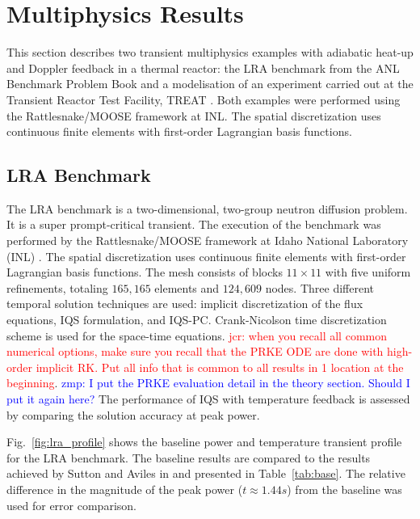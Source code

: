 \documentclass{elsarticle}
\newcommand{\fig}[1]{Fig.~\ref{#1}}                      %
\newcommand{\tbl}[1]{Table~\ref{#1}}                     %
\newcommand{\iqspc}{IQS-PC\xspace}
\newcommand{\jcr}[1]{\textcolor{red}{jcr: #1}}
\newcommand{\zmp}[1]{\textcolor{blue}{zmp: #1}}
\begin{document}
\section{Multiphysics Results}

This section describes two transient multiphysics examples with adiabatic heat-up and Doppler feedback in a thermal reactor: the LRA benchmark from the  ANL Benchmark Problem Book \cite{ANL_BPB} 
and a modelisation of an experiment carried out at the Transient Reactor Test Facility, TREAT \cite{mammoth, Tran15}. 
Both examples were performed using the Rattlesnake/MOOSE framework at INL. The spatial discretization uses continuous finite elements with first-order Lagrangian basis functions.

\subsection{LRA Benchmark}

The LRA benchmark is a two-dimensional, two-group neutron diffusion problem.  
It is a super prompt-critical transient. The execution of the benchmark was performed by the Rattlesnake/MOOSE framework at Idaho National Laboratory (INL) \cite{wang2013}.  The spatial discretization uses continuous finite elements with first-order Lagrangian basis functions. The mesh consists of blocks $11\times 11$ with five uniform refinements, totaling $165,165$ elements and $124,609$ nodes. Three different temporal solution techniques are used: implicit discretization of the flux equations, IQS formulation, and \iqspc. Crank-Nicolson time discretization scheme is used for the space-time equations. \jcr{when you recall all common numerical options, make sure you recall that the PRKE ODE are done with high-order implicit RK. Put all info that is common to all results in 1 location at the beginning}. 
\zmp{I put the PRKE evaluation detail in the theory section. Should I put it again here?}
The performance of IQS with temperature feedback is assessed by comparing the solution accuracy at peak power.

\fig{fig:lra_profile} shows the baseline power and temperature transient profile for the LRA benchmark. The baseline results are compared to the results achieved by Sutton and Aviles in \cite{Sutton_1996} and presented in \tbl{tab:base}.  The relative difference in the magnitude of the peak power ($t\approx1.44 s$) from the baseline was used for error comparison.  
\end{document}

